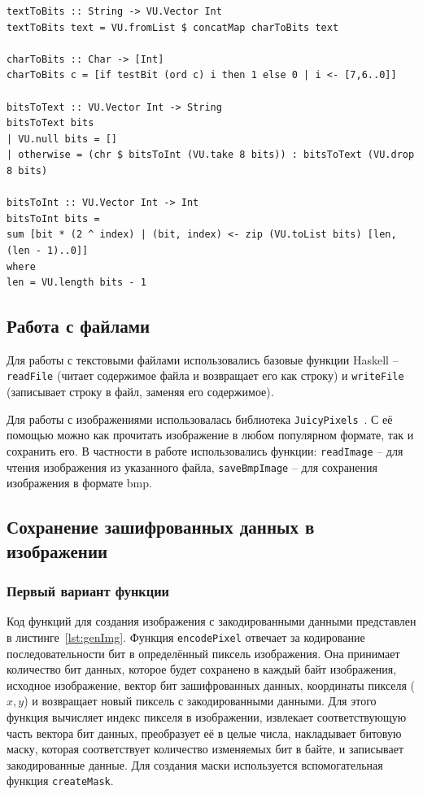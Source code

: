 \documentclass[11pt,a4paper,final]{article} %
\begin{document}
\begin{lstlisting}[caption={Функции для конвертации текста в последовательность бит и обратно.}, label={lst:bit}]
textToBits :: String -> VU.Vector Int
textToBits text = VU.fromList $ concatMap charToBits text

charToBits :: Char -> [Int]
charToBits c = [if testBit (ord c) i then 1 else 0 | i <- [7,6..0]]

bitsToText :: VU.Vector Int -> String
bitsToText bits
| VU.null bits = []
| otherwise = (chr $ bitsToInt (VU.take 8 bits)) : bitsToText (VU.drop 8 bits)

bitsToInt :: VU.Vector Int -> Int
bitsToInt bits = 
sum [bit * (2 ^ index) | (bit, index) <- zip (VU.toList bits) [len,(len - 1)..0]]
where
len = VU.length bits - 1
\end{lstlisting}


\subsection{Работа с файлами}
Для работы с текстовыми файлами использовались базовые функции Haskell -- \texttt{readFile} (читает содержимое файла и возвращает его как строку) и \texttt{writeFile} (записывает строку в файл, заменяя его содержимое).

Для работы с изображениями использовалась библиотека \texttt{JuicyPixels}~\cite{JuicyPixels}. С её помощью можно как прочитать изображение в любом популярном формате, так и сохранить его. В частности в работе использовались функции: \texttt{readImage} -- для чтения изображения из указанного файла, \texttt{saveBmpImage} -- для сохранения изображения в формате bmp.


\subsection{Сохранение зашифрованных данных в изображении}
\subsubsection{Первый вариант функции}

Код функций для создания изображения с закодированными данными представлен в листинге~\ref{lst:genImg}. Функция \texttt{encodePixel} отвечает за кодирование последовательности бит в определённый пиксель изображения. Она принимает количество бит данных, которое будет сохранено в каждый байт изображения, исходное изображение, вектор бит зашифрованных данных, координаты пикселя (\(x, y\)) и возвращает новый пиксель с закодированными данными. Для этого функция вычисляет индекс пикселя в изображении, извлекает соответствующую часть вектора бит данных, преобразует её в целые числа, накладывает битовую маску, которая соответствует количество изменяемых бит в байте, и записывает закодированные данные. Для создания маски используется вспомогательная функция \texttt{createMask}.
\end{document}
